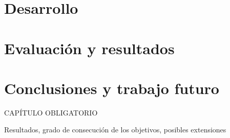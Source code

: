 \documentclass[oneside,12pt]{book}
\begin{document}
\chapter{Desarrollo}
\newpage

\chapter{Evaluación y resultados}


\chapter{Conclusiones y trabajo futuro}
%
CAPÍTULO OBLIGATORIO

Resultados,  grado  de  consecución  de  los  objetivos,  posibles extensiones
\newpage


\end{document}
